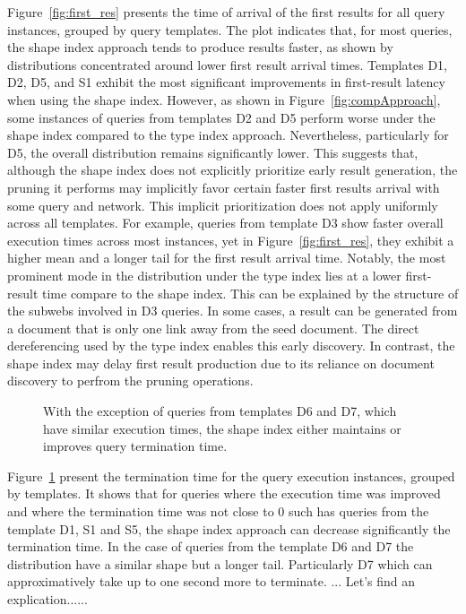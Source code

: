 Figure~\ref{fig:first_res} presents the time of arrival of the first results for all query instances, grouped by query templates. 
The plot indicates that, for most queries, the shape index approach tends to produce results faster, as shown by distributions concentrated around lower first result arrival times.
Templates D1, D2, D5, and S1 exhibit the most significant improvements in first-result latency when using the shape index.
However, as shown in Figure~\ref{fig:compApproach}, some instances of queries from templates D2 and D5 perform worse under the shape index compared to the type index approach.
Nevertheless, particularly for D5, the overall distribution remains significantly lower.
This suggests that, although the shape index does not explicitly prioritize early result generation, the pruning it performs may implicitly favor certain faster first results arrival with some query and network. 
This implicit prioritization does not apply uniformly across all templates. 
For example, queries from template D3 show faster overall execution times across most instances, yet in Figure~\ref{fig:first_res}, they exhibit a higher mean and a longer tail for the first result arrival time.
Notably, the most prominent mode in the distribution under the type index lies at a lower first-result time compare to the shape index.
This can be explained by the structure of the subwebs involved in D3 queries.
In some cases, a result can be generated from a document that is only one link away from the seed document.
The direct dereferencing used by the type index enables this early discovery.
In contrast, the shape index may delay first result production due to its reliance on document discovery to perfrom the pruning operations.


\begin{figure}
    \centering
    
    \caption{With the exception of queries from templates D6 and D7, which have similar execution times, the shape index either maintains or improves query termination time.}
    \label{fig:termination_time}
\end{figure}

Figure~\ref{fig:termination_time} present the termination time for the query execution instances, grouped by templates.
It shows that for queries where the execution time was improved and where the termination time was not close to 0 such has queries from the template D1, S1 and S5, 
the shape index approach can decrease significantly the termination time.
In the case of queries from the template D6 and D7 the distribution have a similar shape but a longer tail.
Particularly D7 which can approximatively take up to one second more to terminate.
... Let's find an explication......



